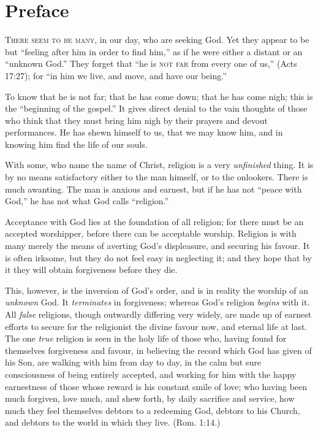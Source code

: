 \documentclass[
]{book}
\begin{document}
\clearpage
\setcounter{page}{1}

\hypertarget{preface}{%
\chapter*{Preface}\label{preface}}

\textsc{There seem to be many}, in our day, who are seeking God. Yet they appear to be but ``feeling after him in order to find him,'' as if he were either a distant or an ``unknown God.'' They forget that ``he is \textsc{not far} from every one of us,'' (Acts 17:27); for ``in him we live, and move, and have our being.''

To know that he is not far; that he has come down; that he has come nigh; this is the ``beginning of the gospel.'' It gives direct denial to the vain thoughts of those who think that they must bring him nigh by their prayers and devout performances. He has shewn himself to us, that we may know him, and in knowing him find the life of our souls.

With some, who name the name of Christ, religion is a very \emph{unfinished} thing. It is by no means satisfactory either to the man himself, or to the onlookers. There is much awanting. The man is anxious and earnest, but if he has not ``peace with God,'' he has not what God calls ``religion.''

Acceptance with God lies at the foundation of all religion; for there must be an accepted worshipper, before there can be acceptable worship. Religion is with many merely the means of averting God's displeasure, and securing his favour. It is often irksome, but they do not feel easy in neglecting it; and they hope that by it they will obtain forgiveness before they die.

This, however, is the inversion of God's order, and is in reality the worship of an \emph{unknown} God. It \emph{terminates} in forgiveness; whereas God's religion \emph{begins} with it. All \emph{false} religions, though outwardly differing very widely, are made up of earnest efforts to secure for the religionist the divine favour now, and eternal life at last. The one \emph{true} religion is seen in the holy life of those who, having found for themselves forgiveness and favour, in believing the record which God has given of his Son, are walking with him from day to day, in the calm but sure consciousness of being entirely accepted, and working for him with the happy earnestness of those whose reward is his constant smile of love; who having been much forgiven, love much, and shew forth, by daily sacrifice and service, how much they feel themselves debtors to a redeeming God, debtors to his Church, and debtors to the world in which they live. (Rom. 1:14.)
\end{document}
